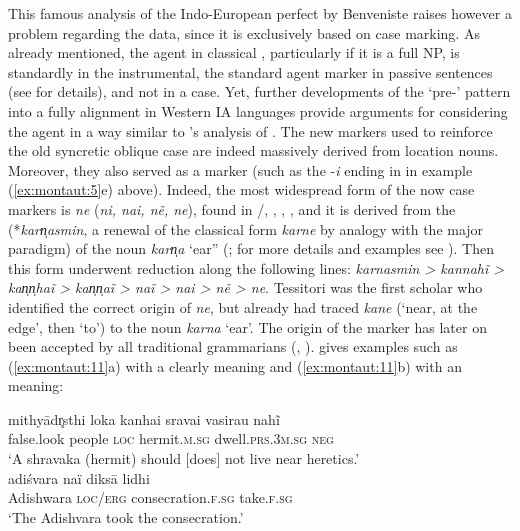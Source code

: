 \documentclass[output=paper]{langsci/langscibook}
\begin{document}
This famous analysis of the Indo-European perfect by Benveniste raises however a problem regarding the  data, since it is exclusively based on case marking. As already mentioned, the agent in classical , particularly if it is a full NP, is standardly in the instrumental, the standard agent marker in passive sentences (see \citealt{MontautInPress} for details), and not in a  case. Yet, further developments of the `pre-’ pattern into a fully  alignment in Western IA languages provide arguments for considering the agent in a way similar to \citeauthor{Benveniste1966[1952]}’s analysis of . The new markers used to reinforce the old syncretic oblique case are indeed massively derived from location nouns. Moreover, they also served as a  marker (such as the -\textit{i} ending in  in example (\ref{ex:montaut:5}e) above). Indeed, the most widespread form of the now  case markers is \textit{ne} (\textit{ni, nai, nẽ, ne}), found in /, , , , and it is derived from the  (*\textit{karn̩asmin}, a renewal of the classical form \textit{karne} by analogy with the major paradigm) of the noun \textit{karn̩a} `ear” (\citealt[65ff]{Tessitori19141916}; for more details and examples see \citealt{MontautInPress}). Then this form underwent reduction along the following lines: \textit{karnasmin > kannahĩ > kan̩n̩haĩ > kan̩n̩aĩ > naĩ > nai > nẽ > ne}. Tessitori was the first scholar who identified the correct origin of \textit{ne}, but already \citet[401]{Trumpp1872} had traced \textit{kane} (`near, at the edge’, then `to’) to the  noun \textit{karna} `ear’. The origin of the  marker has later on been accepted by all traditional grammarians (\citealt{Tiwari1961}, \citealt{Tiwari1966,Saxena1937,Chatterji1926,Chatak1966}). \citet[68--70]{Tessitori19141916} gives examples such as (\ref{ex:montaut:11}a) with a clearly  meaning and (\ref{ex:montaut:11}b) with an  meaning:


\ea\label{ex:montaut:11}
\ea  
\gll mithyādr̥sthi  loka  kanhai    sravai  vasirau   nahĩ\\
false.look  people  \textsc{loc}   hermit.\textsc{m.sg}   dwell.\textsc{prs.3m.sg}  \textsc{neg} \\
\glt ‘A shravaka (hermit) should [does] not live near heretics.’
\ex 
{}\\
\gll adiśvara  naï        diksā                  lidhi\\
Adishwara  \textsc{loc/erg} consecration.\textsc{f.sg}    take.\textsc{f.sg} \\
\glt ‘The Adishvara took the consecration.’
\z 
\z 
\end{document}
